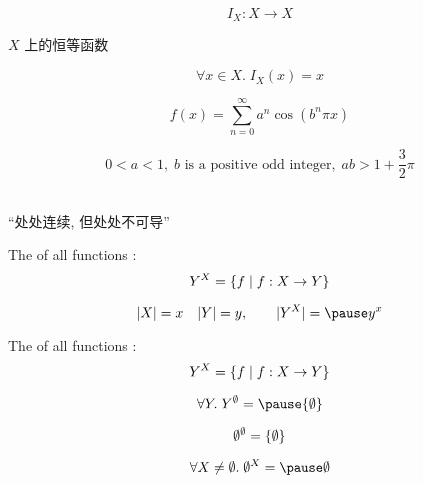 \begin{frame}{}
  \[
    I_{X} : X \to X
  \]

  \vspace{0.20cm}
  \begin{center}
    $X$ 上的恒等函数
  \end{center}

  \[
    \forall x \in X.\; I_{X}(x) = x
  \]
\end{frame}

\begin{frame}{}
  \[
    f(x)=\sum_{n=0} ^\infty a^n \cos(b^n \pi x)
  \]

  \[
    0 < a < 1,\; b \text{ is a positive odd integer},\; ab > 1+\frac{3}{2} \pi
  \]


  \pause
  \begin{center}
     \\[3pt]
    ``处处连续, 但处处不可导''
  \end{center}
\end{frame}

\begin{frame}
  \begin{definition}[$Y^{X}$]
    The  of all functions :
    \[
      Y^{X} = \{f \mid f: X \to Y\}
    \]
  \end{definition}

  \pause
  \vspace{0.50cm}
  \[
    |X| = x \quad |Y| = y, \qquad |Y^{X}| = \pause y^{x}
  \]
\end{frame}

\begin{frame}{}
  \begin{definition}[$Y^{X}$]
    The  of all functions :
    \[
      Y^{X} = \{f \mid f: X \to Y\}
    \]
  \end{definition}

  \[
    \forall Y.\; Y^{\emptyset} = \pause \set{\emptyset}
  \]

  \pause
  \vspace{-0.30cm}
  \[
    \emptyset^{\emptyset} = \{\emptyset\}
  \]

  \pause
  \[
    \forall X \neq \emptyset.\; \emptyset^{X} = \pause \emptyset
  \]
\end{frame}

